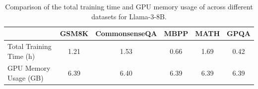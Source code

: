\begin{table}
\centering
\small
\caption{Comparison of the total training time and GPU memory usage of \LRM across different datasets for Llama-3-8B.}
\begin{tabular}{lccccc}
\toprule
                       & 
                       \textbf{GSM8K}& \textbf{CommonsenseQA}  & \textbf{MBPP} & \textbf{MATH} & \textbf{GPQA}
\\ \midrule 
Total Training Time 
(h)&1.21			&1.53&0.66&1.69&0.42\\
GPU Memory Usage (GB)&6.39				&6.40&6.39&6.39&6.39\\
\bottomrule
\end{tabular}
\label{tab:training_efficiency_analysis_llama3}
\end{table}
